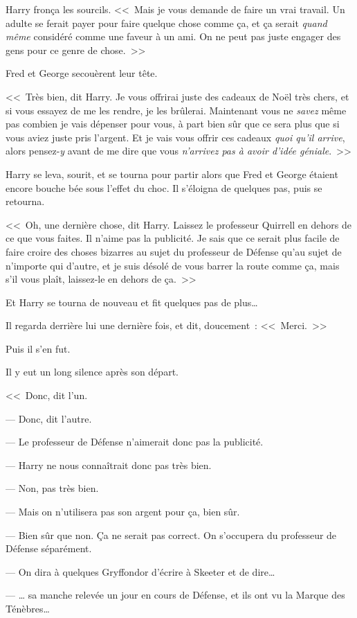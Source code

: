 Harry fronça les sourcils. <<~Mais je vous demande de faire un vrai travail. Un adulte se ferait payer pour faire quelque chose comme ça, et ça serait \emph{quand même} considéré comme une faveur à un ami. On ne peut pas juste engager des gens pour ce genre de chose.~>>

Fred et George secouèrent leur tête.

<<~Très bien, dit Harry. Je vous offrirai juste des cadeaux de Noël très chers, et si vous essayez de me les rendre, je les brûlerai. Maintenant vous ne \emph{savez} même pas combien je vais dépenser pour vous, à part bien sûr que ce sera plus que si vous aviez juste pris l'argent. Et je vais vous offrir ces cadeaux \emph{quoi qu'il arrive}, alors pensez-\emph{y} avant de me dire que vous \emph{n'arrivez pas à avoir d'idée géniale}.~>>

Harry se leva, sourit, et se tourna pour partir alors que Fred et George étaient encore bouche bée sous l'effet du choc. Il s'éloigna de quelques pas, puis se retourna.

<<~Oh, une dernière chose, dit Harry. Laissez le professeur Quirrell en dehors de ce que vous faites. Il n'aime pas la publicité. Je sais que ce serait plus facile de faire croire des choses bizarres au sujet du professeur de Défense qu'au sujet de n'importe qui d'autre, et je suis désolé de vous barrer la route comme ça, mais s'il vous plaît, laissez-le en dehors de ça.~>>

Et Harry se tourna de nouveau et fit quelques pas de plus…

Il regarda derrière lui une dernière fois, et dit, doucement~: <<~Merci.~>>

Puis il s'en fut.

Il y eut un long silence après son départ.

<<~Donc, dit l'un.

--- Donc, dit l'autre.

--- Le professeur de Défense n'aimerait donc pas la publicité.

--- Harry ne nous connaîtrait donc pas très bien.

--- Non, pas très bien.

--- Mais on n'utilisera pas son argent pour ça, bien sûr.

--- Bien sûr que non. Ça ne serait pas correct. On s'occupera du professeur de Défense séparément.

--- On dira à quelques Gryffondor d'écrire à Skeeter et de dire…

--- … sa manche relevée un jour en cours de Défense, et ils ont vu la Marque des Ténèbres…


